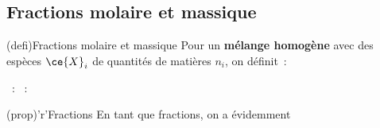 \documentclass[../../main/main.tex]{subfiles}
\begin{document}
\subsection{Fractions molaire et massique}
\begin{tcbraster}[raster columns=3, raster equal height=rows]

	\begin{tcb}[label=def:fractionsmolmass, raster multicolumn=2](defi){Fractions molaire et massique}
		Pour un \textbf{mélange homogène} avec des espèces $\ce{X}_i$ de quantités
		de matières $n_i$, on définit~:
		\begin{itemize}
			~:
			~:
		\end{itemize}
	\end{tcb}
	\begin{tcb}(prop)'r'{Fractions}
		En tant que fractions, on a évidemment
		\csw{
			\[
				\boxed{\sum x_i = 1 = \sum w_i}
			\]
		}
	\end{tcb}

\end{tcbraster}
\end{document}
